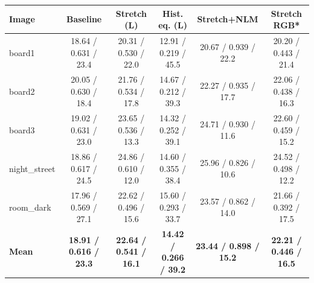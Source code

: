 \begin{tabular}{lccccc}\toprule Image & Baseline & Stretch (L) & Hist. eq. (L) & Stretch+NLM & Stretch RGB* \\ \midrule
board1 & 18.64 / 0.631 / 23.4 & 20.31 / 0.530 / 22.0 & 12.91 / 0.219 / 45.5 & 20.67 / 0.939 / 22.2 & 20.20 / 0.443 / 21.4 \\
board2 & 20.05 / 0.630 / 18.4 & 21.76 / 0.534 / 17.8 & 14.67 / 0.212 / 39.3 & 22.27 / 0.935 / 17.7 & 22.06 / 0.438 / 16.3 \\
board3 & 19.02 / 0.631 / 23.0 & 23.65 / 0.536 / 13.3 & 14.32 / 0.252 / 39.1 & 24.71 / 0.930 / 11.6 & 22.60 / 0.459 / 15.2 \\
night\_street & 18.86 / 0.617 / 24.5 & 24.86 / 0.610 / 12.0 & 14.60 / 0.355 / 38.4 & 25.96 / 0.826 / 10.6 & 24.52 / 0.498 / 12.2 \\
room\_dark & 17.96 / 0.569 / 27.1 & 22.62 / 0.496 / 15.6 & 15.60 / 0.293 / 33.7 & 23.57 / 0.862 / 14.0 & 21.66 / 0.392 / 17.5 \\
\midrule
\textbf{Mean} & \textbf{18.91 / 0.616 / 23.3} & \textbf{22.64 / 0.541 / 16.1} & \textbf{14.42 / 0.266 / 39.2} & \textbf{23.44 / 0.898 / 15.2} & \textbf{22.21 / 0.446 / 16.5} \\
\bottomrule\end{tabular}